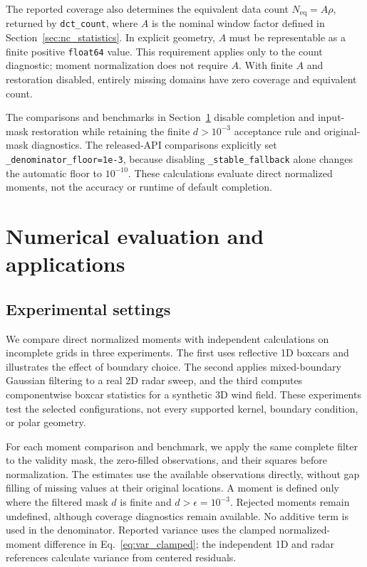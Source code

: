 \documentclass[a4paper,fleqn]{cas-sc}
\begin{document}
The reported coverage also determines the equivalent data count $N_{\mathrm{eq}}=A\rho$, returned by \texttt{dct\_count}, where $A$ is the nominal window factor defined in Section~\ref{sec:nc_statistics}. In explicit geometry, $A$ must be representable as a finite positive \texttt{float64} value. This requirement applies only to the count diagnostic; moment normalization does not require $A$. With finite $A$ and restoration disabled, entirely missing domains have zero coverage and equivalent count.

The comparisons and benchmarks in Section~\ref{sec:validation} disable completion and input-mask restoration while retaining the finite $d>10^{-3}$ acceptance rule and original-mask diagnostics. The released-API comparisons explicitly set \texttt{\_denominator\_floor=1e-3}, because disabling \texttt{\_stable\_fallback} alone changes the automatic floor to $10^{-10}$. These calculations evaluate direct normalized moments, not the accuracy or runtime of default completion.

\section{Numerical evaluation and applications}
\label{sec:validation}

\subsection{Experimental settings}

We compare direct normalized moments with independent calculations on incomplete grids in three experiments. The first uses reflective 1D boxcars and illustrates the effect of boundary choice. The second applies mixed-boundary Gaussian filtering to a real 2D radar sweep, and the third computes componentwise boxcar statistics for a synthetic 3D wind field. These experiments test the selected configurations, not every supported kernel, boundary condition, or polar geometry.

For each moment comparison and benchmark, we apply the same complete filter to the validity mask, the zero-filled observations, and their squares before normalization. The estimates use the available observations directly, without gap filling of missing values at their original locations. A moment is defined only where the filtered mask $d$ is finite and $d>\epsilon=10^{-3}$. Rejected moments remain undefined, although coverage diagnostics remain available. No additive term is used in the denominator. Reported variance uses the clamped normalized-moment difference in Eq.~\ref{eq:var_clamped}; the independent 1D and radar references calculate variance from centered residuals.
\end{document}
